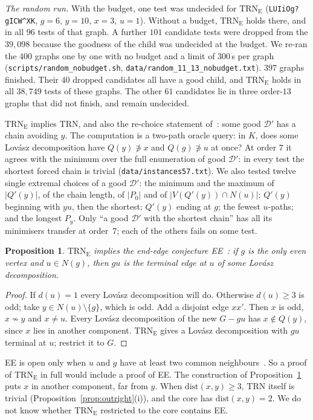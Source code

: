 \documentclass[11pt]{amsart}
\newtheorem{proposition}[theorem]{Proposition}
\theoremstyle{definition}
\newcommand{\cD}{\mathcal D}
\newcommand{\TRN}{\mathrm{TRN}}
\newcommand{\TRNE}{\mathrm{TRN}_{\mathrm E}}
\begin{document}
\emph{The random run.} With the budget, one test was undecided for $\TRNE$ (\texttt{LUIiOg?gICW\^{}XK},
$g=6$, $y=10$, $x=3$, $u=1$). Without a budget, $\TRNE$ holds there, and in all $96$ tests of that
graph. A further $101$ candidate tests were dropped from the $39{,}098$ because the goodness of the
child was undecided at the budget. We re-ran the $400$ graphs one by one with no budget and a limit
of $300$\,s per graph (\texttt{scripts/random\_nobudget.sh},
\texttt{data/random\_11\_13\_nobudget.txt}). $397$ graphs finished. Their $40$ dropped candidates
all have a good child, and $\TRNE$ holds in all $38{,}749$ tests of these graphs. The other $61$
candidates lie in three order-$13$ graphs that did not finish, and remain undecided.

$\TRNE$ implies $\TRN$, and also the re-choice statement of~\cite{L1I}: some good $\cD'$ has a
chain avoiding $y$. The computation is a two-path oracle query: in $K$, does some Lov\'asz
decomposition have $Q(y)\not\ni x$ and $Q(g)\not\ni u$ at once? At order $7$ it agrees with the
minimum over the full enumeration of good $\cD'$: in every test the shortest forced chain is trivial
(\texttt{data/instances57.txt}). We also tested twelve single extremal choices of a good $\cD'$: the
minimum and the maximum of $|Q'(y)|$, of the chain length, of $|P_0|$ and of $|V(Q'(y))\cap N(u)|$;
$Q'(y)$ beginning with $yu$, then the shortest; $Q'(y)$ ending at $g$; the fewest $u$-paths; and the
longest $P_y$. Only ``a good $\cD'$ with the shortest chain'' has all its minimisers transfer at
order~$7$; each of the others fails on some test.

\begin{proposition}\label{prop:ee}
$\TRNE$ implies the end-edge conjecture EE~\cite[Conjecture~1.5]{PE}: if $g$ is the only even vertex
and $u\in N(g)$, then $gu$ is the terminal edge at $u$ of some Lov\'asz decomposition.
\end{proposition}

\begin{proof}
If $d(u)=1$ every Lov\'asz decomposition will do. Otherwise $d(u)\ge3$ is odd; take $y\in
N(u)\setminus\{g\}$, which is odd. Add a disjoint edge $xx'$. Then $x$ is odd, $x\not\sim y$ and
$x\ne u$. Every Lov\'asz decomposition of the new $G-gu$ has $x\notin Q(y)$, since $x$ lies in
another component. $\TRNE$ gives a Lov\'asz decomposition with $gu$ terminal at $u$; restrict it to
$G$.
\end{proof}

EE is open only when $u$ and $g$ have at least two common neighbours~\cite[Theorem~5.1 and \S7]{PE}. So a proof of
$\TRNE$ in full would include a proof of EE. The construction of Proposition~\ref{prop:ee} puts $x$
in another component, far from $y$. When $\mathrm{dist}(x,y)\ge3$, $\TRN$ itself is trivial
(Proposition~\ref{prop:outright}(i)), and the core has $\mathrm{dist}(x,y)=2$. We do not know whether
$\TRNE$ restricted to the core contains EE.
\end{document}
